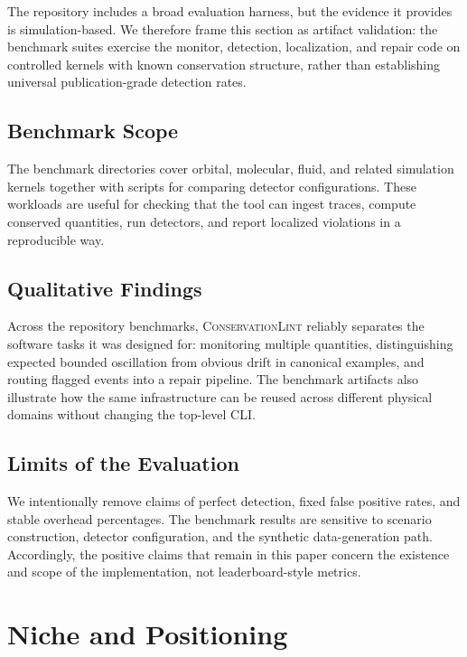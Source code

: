 \documentclass[11pt,a4paper]{article}
\begin{document}
The repository includes a broad evaluation harness, but the evidence it
provides is simulation-based.  We therefore frame this section as
artifact validation: the benchmark suites exercise the monitor,
detection, localization, and repair code on controlled kernels with
known conservation structure, rather than establishing universal
publication-grade detection rates.

\subsection{Benchmark Scope}

The benchmark directories cover orbital, molecular, fluid, and related
simulation kernels together with scripts for comparing detector
configurations.  These workloads are useful for checking that the tool
can ingest traces, compute conserved quantities, run detectors, and
report localized violations in a reproducible way.

\subsection{Qualitative Findings}

Across the repository benchmarks, \textsc{ConservationLint} reliably
separates the software tasks it was designed for: monitoring multiple
quantities, distinguishing expected bounded oscillation from obvious
drift in canonical examples, and routing flagged events into a repair
pipeline.  The benchmark artifacts also illustrate how the same
infrastructure can be reused across different physical domains without
changing the top-level CLI.

\subsection{Limits of the Evaluation}

We intentionally remove claims of perfect detection, fixed false
positive rates, and stable overhead percentages.  The benchmark results
are sensitive to scenario construction, detector configuration, and the
synthetic data-generation path.  Accordingly, the positive claims that
remain in this paper concern the existence and scope of the
implementation, not leaderboard-style metrics.



\section{Niche and Positioning}
\label{sec:niche}
\end{document}
